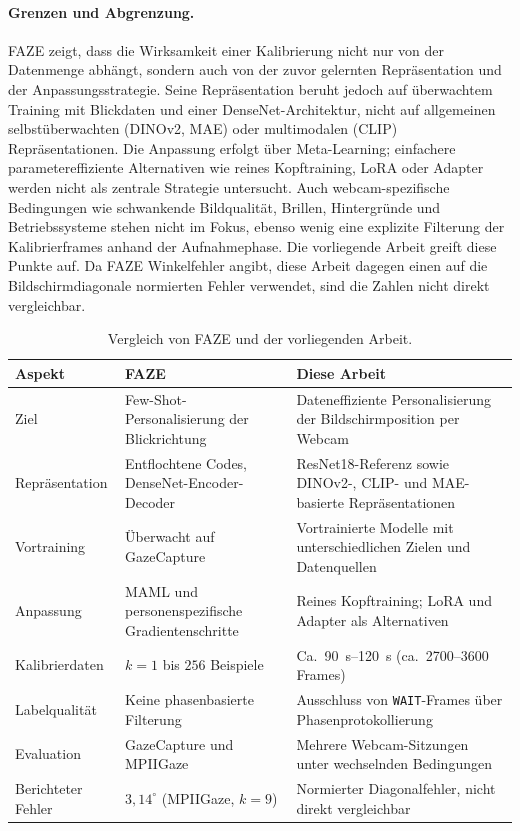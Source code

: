 \documentclass[
  11pt,
  a4paper,
  oneside,
  DIV=12,                 %
  BCOR=8mm,               %
  parskip=half,           %
  headings=normal,
  bibliography=totoc,     %
  listof=totoc            %
]{scrreprt}
\newcommand{\code}[1]{\texttt{#1}}
\begin{document}
\paragraph{Grenzen und Abgrenzung.}
FAZE zeigt, dass die Wirksamkeit einer Kalibrierung nicht nur von der Datenmenge abhängt, sondern auch von der zuvor gelernten Repräsentation und der Anpassungsstrategie. Seine Repräsentation beruht jedoch auf überwachtem Training mit Blickdaten und einer DenseNet-Architektur, nicht auf allgemeinen selbstüberwachten (DINOv2, MAE) oder multimodalen (CLIP) Repräsentationen. Die Anpassung erfolgt über Meta-Learning; einfachere parametereffiziente Alternativen wie reines Kopftraining, LoRA oder Adapter werden nicht als zentrale Strategie untersucht. Auch webcam-spezifische Bedingungen wie schwankende Bildqualität, Brillen, Hintergründe und Betriebssysteme stehen nicht im Fokus, ebenso wenig eine explizite Filterung der Kalibrierframes anhand der Aufnahmephase. Die vorliegende Arbeit greift diese Punkte auf. Da FAZE Winkelfehler angibt, diese Arbeit dagegen einen auf die Bildschirmdiagonale normierten Fehler verwendet, sind die Zahlen nicht direkt vergleichbar.

\begin{table}[htbp]
  \centering
  \small
  \caption{Vergleich von FAZE und der vorliegenden Arbeit.}
  \label{tab:faze_vergleich}
  \begin{tabularx}{\textwidth}{L{3.0cm} Y Y}
    \toprule
    \textbf{Aspekt} & \textbf{FAZE~\cite{park2019faze}} & \textbf{Diese Arbeit} \\
    \midrule
    Ziel & Few-Shot-Personalisierung der Blickrichtung & Dateneffiziente Personalisierung der Bildschirmposition per Webcam \\
    Repräsentation & Entflochtene Codes, DenseNet-Encoder-Decoder & ResNet18-Referenz sowie DINOv2-, CLIP- und MAE-basierte Repräsentationen \\
    Vortraining & Überwacht auf GazeCapture & Vortrainierte Modelle mit unterschiedlichen Zielen und Datenquellen \\
    Anpassung & MAML und personenspezifische Gradientenschritte & Reines Kopftraining; LoRA und Adapter als Alternativen \\
    Kalibrierdaten & $k = 1$ bis $256$ Beispiele & Ca.\ \SIrange{90}{120}{\second} (ca.\ \num{2700}--\num{3600} Frames) \\
    Labelqualität & Keine phasenbasierte Filterung & Ausschluss von \code{WAIT}-Frames über Phasenprotokollierung \\
    Evaluation & GazeCapture und MPIIGaze & Mehrere Webcam-Sitzungen unter wechselnden Bedingungen \\
    Berichteter Fehler & $3,14^\circ$ (MPIIGaze, $k = 9$) & Normierter Diagonalfehler, nicht direkt vergleichbar \\
    \bottomrule
  \end{tabularx}
\end{table}
\end{document}
